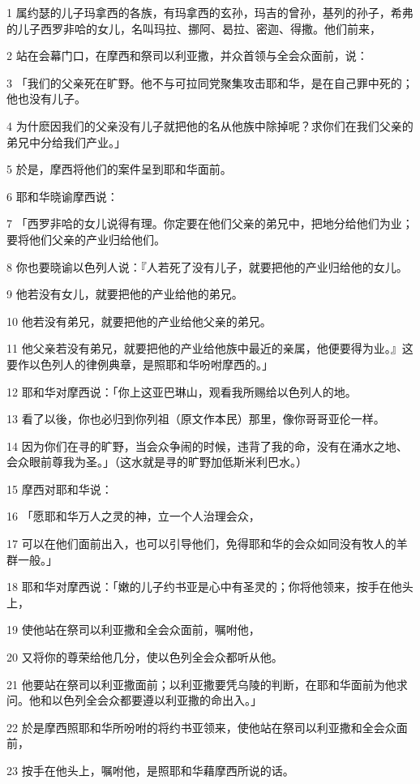 \par 1 属约瑟的儿子玛拿西的各族，有玛拿西的玄孙，玛吉的曾孙，基列的孙子，希弗的儿子西罗非哈的女儿，名叫玛拉、挪阿、曷拉、密迦、得撒。他们前来，
\par 2 站在会幕门口，在摩西和祭司以利亚撒，并众首领与全会众面前，说：
\par 3 「我们的父亲死在旷野。他不与可拉同党聚集攻击耶和华，是在自己罪中死的；他也没有儿子。
\par 4 为什麽因我们的父亲没有儿子就把他的名从他族中除掉呢？求你们在我们父亲的弟兄中分给我们产业。」
\par 5 於是，摩西将他们的案件呈到耶和华面前。
\par 6 耶和华晓谕摩西说：
\par 7 「西罗非哈的女儿说得有理。你定要在他们父亲的弟兄中，把地分给他们为业；要将他们父亲的产业归给他们。
\par 8 你也要晓谕以色列人说：『人若死了没有儿子，就要把他的产业归给他的女儿。
\par 9 他若没有女儿，就要把他的产业给他的弟兄。
\par 10 他若没有弟兄，就要把他的产业给他父亲的弟兄。
\par 11 他父亲若没有弟兄，就要把他的产业给他族中最近的亲属，他便要得为业。』这要作以色列人的律例典章，是照耶和华吩咐摩西的。」
\par 12 耶和华对摩西说：「你上这亚巴琳山，观看我所赐给以色列人的地。
\par 13 看了以後，你也必归到你列祖（原文作本民）那里，像你哥哥亚伦一样。
\par 14 因为你们在寻的旷野，当会众争闹的时候，违背了我的命，没有在涌水之地、会众眼前尊我为圣。」（这水就是寻的旷野加低斯米利巴水。）
\par 15 摩西对耶和华说：
\par 16 「愿耶和华万人之灵的神，立一个人治理会众，
\par 17 可以在他们面前出入，也可以引导他们，免得耶和华的会众如同没有牧人的羊群一般。」
\par 18 耶和华对摩西说：「嫩的儿子约书亚是心中有圣灵的；你将他领来，按手在他头上，
\par 19 使他站在祭司以利亚撒和全会众面前，嘱咐他，
\par 20 又将你的尊荣给他几分，使以色列全会众都听从他。
\par 21 他要站在祭司以利亚撒面前；以利亚撒要凭乌陵的判断，在耶和华面前为他求问。他和以色列全会众都要遵以利亚撒的命出入。」
\par 22 於是摩西照耶和华所吩咐的将约书亚领来，使他站在祭司以利亚撒和全会众面前，
\par 23 按手在他头上，嘱咐他，是照耶和华藉摩西所说的话。

